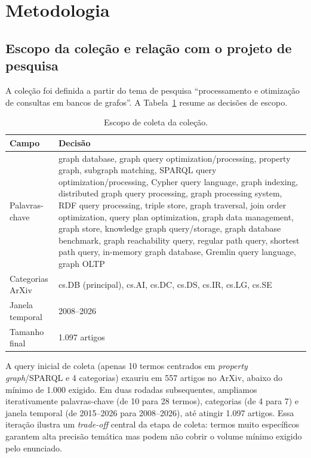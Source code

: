 \documentclass[12pt]{article}
\begin{document}
\section{Metodologia}

\subsection{Escopo da coleção e relação com o projeto de pesquisa}

A coleção foi definida a partir do tema de pesquisa ``processamento e
otimização de consultas em bancos de grafos''. A Tabela~\ref{tab:escopo}
resume as decisões de escopo.

\begin{table}[h]
\centering
\caption{Escopo de coleta da coleção.}
\label{tab:escopo}
\small
\begin{tabular}{p{1.6cm}p{5.6cm}}
\toprule
Campo & Decisão \\
\midrule
Palavras-chave & graph database, graph query optimization/processing,
property graph, subgraph matching, SPARQL query optimization/processing,
Cypher query language, graph indexing, distributed graph query processing,
graph processing system, RDF query processing, triple store, graph
traversal, join order optimization, query plan optimization, graph data
management, graph store, knowledge graph query/storage, graph database
benchmark, graph reachability query, regular path query, shortest path
query, in-memory graph database, Gremlin query language, graph OLTP \\
Categorias ArXiv & cs.DB (principal), cs.AI, cs.DC, cs.DS, cs.IR, cs.LG, cs.SE \\
Janela temporal & 2008--2026 \\
Tamanho final & 1.097 artigos \\
\bottomrule
\end{tabular}
\end{table}

A query inicial de coleta (apenas 10 termos centrados em \textit{property
graph}/SPARQL e 4 categorias) exauriu em 557 artigos no ArXiv, abaixo do
mínimo de 1.000 exigido. Em duas rodadas subsequentes, ampliamos
iterativamente palavras-chave (de 10 para 28 termos), categorias (de 4 para
7) e janela temporal (de 2015--2026 para 2008--2026), até atingir 1.097
artigos. Essa iteração ilustra um \textit{trade-off} central da etapa de
coleta: termos muito específicos garantem alta precisão temática mas podem
não cobrir o volume mínimo exigido pelo enunciado.
\end{document}
